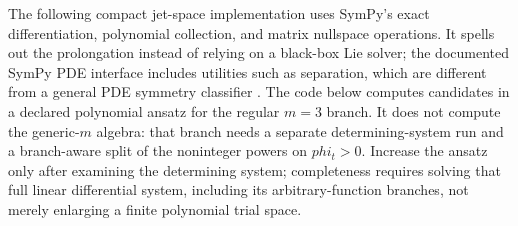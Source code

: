 The following compact jet-space implementation uses SymPy's exact
differentiation, polynomial collection, and matrix nullspace operations. It
spells out the prolongation instead of relying on a black-box Lie solver;
the documented SymPy PDE interface includes utilities such as separation,
which are different from a general PDE symmetry classifier \cite{sympydocs}.
The code below computes candidates in a declared polynomial ansatz for the
regular $m=3$ branch. It does not compute the generic-$m$ algebra: that branch
needs a separate determining-system run and a branch-aware split of the
noninteger powers on $phi_t>0$. Increase the ansatz only after examining the
determining system; completeness requires solving that full linear
differential system, including its arbitrary-function branches, not merely
enlarging a finite polynomial trial space.

